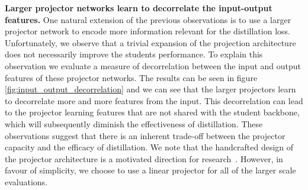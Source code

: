 \documentclass[letterpaper]{article} \usepackage[submission]{aaai23}  \usepackage{times}  \usepackage{helvet}  \usepackage{courier}  \usepackage[hyphens]{url}  \usepackage{graphicx} \urlstyle{rm} \def\UrlFont{\rm}  \usepackage{natbib}  \usepackage{caption} \frenchspacing  \setlength{\pdfpagewidth}{8.5in} \setlength{\pdfpageheight}{11in} \usepackage{algorithm}
\begin{document}
\textbf{Larger projector networks learn to decorrelate the input-output features.}
One natural extension of the previous observations is to use a larger projector network to encode more information relevant for the distillation loss. Unfortunately, we observe that a trivial expansion of the projection architecture does not necessarily improve the students performance. To explain this observation we evaluate a measure of decorrelation between the input and output features of these projector networks. The results can be seen in figure \ref{fig:input_output_decorrelation} and we can see that the larger projectors learn to decorrelate more and more features from the input. This decorrelation can lead to the projector learning features that are not shared with the student backbone, which will subsequently diminish the effectiveness of distillation. These observations suggest that there is an inherent trade-off between the projector capacity and the efficacy of distillation. We note that the handcrafted design of the projector architecture is a motivated direction for research~\cite{Chen2022ImprovedEnsemble, Navaneet2021SimReg:Distillation}.
However, in favour of simplicity, we choose to use a linear projector for all of the larger scale evaluations. \\
\end{document}
